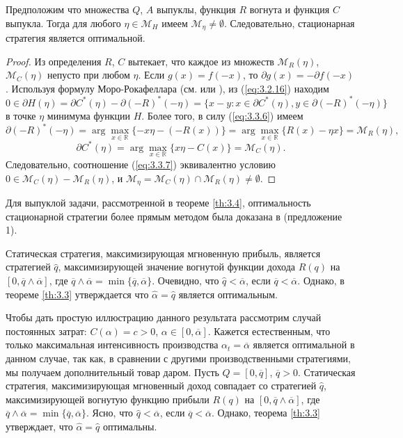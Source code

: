 \begin{theorem} \label{th:3.4}
Предположим что множества $Q$, $A$ выпуклы, функция $R$ вогнута и функция $C$ выпукла.
Тогда для любого $\eta\in\mathscr M_H$ имеем
$\mathscr M_\eta\neq\emptyset$.
Следовательно, стационарная стратегия является оптимальной.
\end{theorem}
\begin{proof}
Из определения $R$, $C$ вытекает, что каждое из множеств $\mathscr M_R(\eta)$, $\mathscr M_C(\eta)$ непусто при любом $\eta$.
Если $g(x)=f(-x)$, то $\partial g(x)=-\partial f(-x)$.
Используя формулу Моро-Рокафеллара (см. \cite[теорема 23.8]{Roc70}  или \cite[теорема 3.6.3]{AusTeb03}), из (\ref{eq:3.2.16}) находим
\begin{equation} \label{eq:3.3.7}
0\in\partial H(\eta)=\partial C^*(\eta)-\partial(-R)^*(-\eta)=\{x-y:x\in\partial C^*(\eta), y\in\partial(-R)^*(-\eta)\}
\end{equation}
в точке $\eta$ минимума функции $H$. Более того, в силу (\ref{eq:3.3.6}) имеем
$$\partial(-R)^*(-\eta)=\arg\max_{x\in\mathbb R}\{-x\eta-(-R(x))\}=\arg\max_{x\in\mathbb R} \{R(x)-\eta x\}
=\mathscr M_R(\eta),$$
$$\partial C^*(\eta)=\arg\max_{x\in\mathbb R}\{x\eta -C(x)\}=\mathscr M_C(\eta).$$
Следовательно, соотношение (\ref{eq:3.3.7}) эквивалентно условию $0\in\mathscr M_C(\eta)-\mathscr M_R(\eta)$, и
$\mathscr M_\eta=\mathscr M_C(\eta)\cap\mathscr M_R(\eta)\neq\emptyset.$
\end{proof}

Для выпуклой задачи, рассмотренной в теореме \ref{th:3.4}, оптимальность стационарной стратегии более прямым методом была доказана в \cite{ChaJouTah03} (предложение 1).

Статическая стратегия, максимизирующая мгновенную прибыль, является стратегией $\widehat q$, максимизирующей значение вогнутой функции дохода $R(q)$ на $[0,\overline q\wedge\overline\alpha]$, где $\overline q\wedge\overline\alpha=\min\{\overline q,\overline\alpha\}$.
Очевидно, что $\widehat q<\overline\alpha$, если $\overline q<\overline\alpha$. Однако, в теореме \ref{th:3.3} утверждается что $\widehat\alpha=\widehat q$ является оптимальным.

Чтобы дать простую иллюстрацию данного результата рассмотрим случай постоянных затрат:
$C(\alpha)=c>0$, $\alpha\in [0,\overline\alpha].$
Кажется естественным, что только максимальная интенсивность производства $\alpha_t=\overline\alpha$ является оптимальной в данном случае, так как, в сравнении с другими производственными стратегиями, мы получаем дополнительный товар даром. Пусть $Q=[0,\overline q]$, $\overline q>0$. Статическая стратегия, максимизирующая мгновенный доход совпадает со стратегией $\widehat q$, максимизирующей вогнутую функцию прибыли $R(q)$ на $[0,\overline q\wedge\overline\alpha]$, где $\overline q\wedge\overline\alpha=\min\{\overline q,\overline\alpha\}$. Ясно, что $\widehat q<\overline\alpha$, если $\overline q<\overline\alpha$. Однако, теорема \ref{th:3.3} утверждает, что $\widehat\alpha=\widehat q$ оптимальны.

